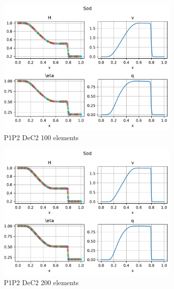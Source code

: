 \documentclass[english]{article}
\theoremstyle{thmstyleone}
\theoremstyle{thmstyletwo}
\theoremstyle{thmstylethree}
\begin{document}
\begin{figure}
{\begin{minipage}{\textwidth}
			\begin{subfigure}{0.45\textwidth}
				\includegraphics[trim= 0 180 0 0, clip,width=\textwidth]{figures/sod/P1P2_DeC_N_el00100.pdf}
				\caption{P1P2 DeC2 100 elements}
			\end{subfigure}
			\begin{subfigure}{0.45\textwidth}
				\includegraphics[trim= 0 180 0 0, clip,width=\textwidth]{figures/sod/P1P2_DeC_N_el00200.pdf}
				\caption{P1P2 DeC2 200 elements}
			\end{subfigure}
			\begin{subfigure}{0.45\textwidth}

\end{subfigure}
\end{minipage}}
\end{figure}
\end{document}
